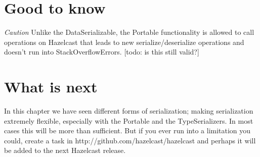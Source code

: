 \section{Good to know}

\emph{Caution} Unlike the DataSerializable, the Portable functionality is allowed to call operations on Hazelcast that leads to new serialize/deserialize operations and doesn't run into StackOverflowErrors. [todo: is this still valid?]

\section{What is next}
In this chapter we have seen different forms of serialization; making serialization extremely flexible, especially with the Portable and the TypeSerializers. In most cases this will be more than sufficient. But if you ever run into a limitation you could, create a task in http://github.com/hazelcast/hazelcast and perhaps it will be added to the next Hazelcast release.